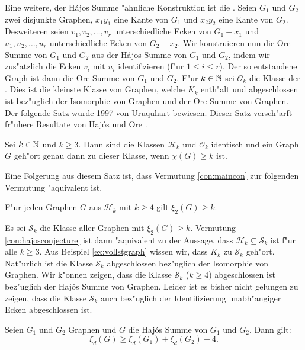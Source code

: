 Eine weitere, der H\'ajos Summe "ahnliche Konstruktion ist die . Seien $G_1$ und $G_2$ zwei disjunkte Graphen, $x_1y_1$ eine Kante von $G_1$ und $x_2y_2$ eine Kante von $G_2$. Desweiteren seien $v_1,v_2,\dots,v_r$ unterschiedliche Ecken von $G_1- x_1$ und $u_1,u_2,\dots,u_r$ unterschiedliche Ecken von $G_2- x_2$. 
Wir konstruieren nun die Ore Summe von $G_1$ und $G_2$ aus der H\'ajos Summe von $G_1$ und $G_2$, indem wir zus"atzlich die Ecken $v_i$ mit $u_i$ identifizieren (f"ur $1\leq i \leq r$). Der so entstandene Graph ist dann die Ore Summe von $G_1$ und $G_2$. 
F"ur $k\in {\mathbb{N}}$ sei $\mathcal{O}_k$ die Klasse der . Dies ist die kleinste Klasse von Graphen, welche $K_k$ enth"alt und abgeschlossen ist bez"uglich der Isomorphie von Graphen und der Ore Summe von Graphen.
Der folgende Satz wurde 1997 von Uruquhart  \cite{Urquhart97} bewiesen. Dieser Satz versch"arft fr"uhere Resultate von Haj\'os \cite{Hajos61} und Ore \cite{Ore67}. 
\begin{theorem}[Uruquhart]
  Sei $k\in {\mathbb{N}}$ und $k \geq 3$. Dann sind die Klassen $\mathcal{H}_k$ und $\mathcal{O}_k$ identisch und ein Graph $G$ geh"ort genau dann zu dieser Klasse, wenn $\chi(G) \geq k$ ist.
  \label{thm:uruquhart}
\end{theorem}

Eine Folgerung aus diesem Satz ist, dass Vermutung \ref{con:maincon} zur folgenden Vermutung "aquivalent ist.
\begin{conjecture}
  F"ur jeden Graphen $G$ aus $\mathcal{H}_k$ mit $k\geq 4$ gilt $\xi_{2}(G) \geq k$. 
  \label{con:hajosconjecture}
\end{conjecture}
Es sei $\mathcal{S}_k$ die Klasse aller Graphen mit $\xi_{2}(G) \geq k$. Vermutung \ref{con:hajosconjecture} ist dann "aquivalent zu der Aussage, dass $\mathcal{H}_k \subseteq \mathcal{S}_k$ ist f"ur alle $k\geq 3$. 
Aus Beispiel \ref{ex:vollstgraph} wissen wir, dass $K_k$ zu $\mathcal{S}_k$ geh"ort. Nat"urlich ist die Klasse $\mathcal{S}_k$ abgeschlossen bez"uglich der Isomorphie von Graphen. Wir k"onnen zeigen, dass die Klasse $\mathcal{S}_k$ ($k\geq 4$) abgeschlossen ist bez"uglich der Haj\'os Summe von Graphen. Leider ist es bisher nicht gelungen zu zeigen, dass die Klasse $\mathcal{S}_k$ auch bez"uglich der Identifizierung unabh"angiger Ecken abgeschlossen ist.
\begin{theorem}
  Seien $G_1$ und $G_2$ Graphen und $G$ die Haj\'os Summe von $G_1$ und $G_2$. Dann gilt:
  $$\xi_{d}(G) \geq \xi_{d}(G_1) + \xi_{d}(G_2)-4.$$
  \label{thm:hajoseigenwerte}
\end{theorem}

